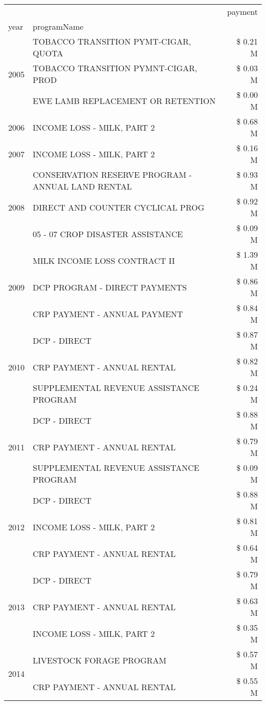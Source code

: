 \begin{tabular}{llr}
\toprule
 &  & payment \\
year & programName &  \\
\midrule
\multirow[t]{3}{*}{2005} & TOBACCO TRANSITION PYMT-CIGAR, QUOTA & \$ 0.21 M \\
 & TOBACCO TRANSITION PYMNT-CIGAR, PROD & \$ 0.03 M \\
 & EWE LAMB REPLACEMENT OR RETENTION & \$ 0.00 M \\
\cline{1-3}
2006 & INCOME LOSS - MILK, PART 2 & \$ 0.68 M \\
\cline{1-3}
2007 & INCOME LOSS - MILK, PART 2 & \$ 0.16 M \\
\cline{1-3}
\multirow[t]{3}{*}{2008} & CONSERVATION RESERVE PROGRAM - ANNUAL LAND RENTAL & \$ 0.93 M \\
 & DIRECT AND COUNTER CYCLICAL PROG & \$ 0.92 M \\
 & 05 - 07 CROP DISASTER ASSISTANCE & \$ 0.09 M \\
\cline{1-3}
\multirow[t]{3}{*}{2009} & MILK INCOME LOSS CONTRACT II & \$ 1.39 M \\
 & DCP PROGRAM - DIRECT PAYMENTS & \$ 0.86 M \\
 & CRP PAYMENT - ANNUAL PAYMENT & \$ 0.84 M \\
\cline{1-3}
\multirow[t]{3}{*}{2010} & DCP - DIRECT & \$ 0.87 M \\
 & CRP PAYMENT - ANNUAL RENTAL & \$ 0.82 M \\
 & SUPPLEMENTAL REVENUE ASSISTANCE PROGRAM & \$ 0.24 M \\
\cline{1-3}
\multirow[t]{3}{*}{2011} & DCP - DIRECT & \$ 0.88 M \\
 & CRP PAYMENT - ANNUAL RENTAL & \$ 0.79 M \\
 & SUPPLEMENTAL REVENUE ASSISTANCE PROGRAM & \$ 0.09 M \\
\cline{1-3}
\multirow[t]{3}{*}{2012} & DCP - DIRECT & \$ 0.88 M \\
 & INCOME LOSS - MILK, PART 2 & \$ 0.81 M \\
 & CRP PAYMENT - ANNUAL RENTAL & \$ 0.64 M \\
\cline{1-3}
\multirow[t]{3}{*}{2013} & DCP - DIRECT & \$ 0.79 M \\
 & CRP PAYMENT - ANNUAL RENTAL & \$ 0.63 M \\
 & INCOME LOSS - MILK, PART 2 & \$ 0.35 M \\
\cline{1-3}
\multirow[t]{3}{*}{2014} & LIVESTOCK FORAGE PROGRAM & \$ 0.57 M \\
 & CRP PAYMENT - ANNUAL RENTAL & \$ 0.55 M \\

\end{tabular}
